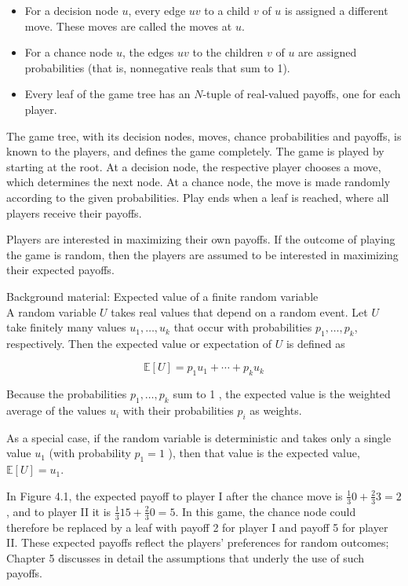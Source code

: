 \documentclass[12pt]{article}
\begin{document}
\begin{itemize}
  \item For a decision node $u$, every edge $u v$ to a child $v$ of $u$ is assigned a different move. These moves are called the moves at $u$.
  \item For a chance node $u$, the edges $u v$ to the children $v$ of $u$ are assigned probabilities (that is, nonnegative reals that sum to 1).
  \item Every leaf of the game tree has an $N$-tuple of real-valued payoffs, one for each player.
\end{itemize}

The game tree, with its decision nodes, moves, chance probabilities and payoffs, is known to the players, and defines the game completely. The game is played by starting at the root. At a decision node, the respective player chooses a move, which determines the next node. At a chance node, the move is made randomly\\
according to the given probabilities. Play ends when a leaf is reached, where all players receive their payoffs.

Players are interested in maximizing their own payoffs. If the outcome of playing the game is random, then the players are assumed to be interested in maximizing their expected payoffs.

Background material: Expected value of a finite random variable\\
A random variable $U$ takes real values that depend on a random event. Let $U$ take finitely many values $u_{1}, \ldots, u_{k}$ that occur with probabilities $p_{1}, \ldots, p_{k}$, respectively. Then the expected value or expectation of $U$ is defined as


\begin{equation*}
\mathbb{E}[U]=p_{1} u_{1}+\cdots+p_{k} u_{k} \tag{4.1}
\end{equation*}


Because the probabilities $p_{1}, \ldots, p_{k}$ sum to 1 , the expected value is the weighted average of the values $u_{i}$ with their probabilities $p_{i}$ as weights.

As a special case, if the random variable is deterministic and takes only a single value $u_{1}$ (with probability $p_{1}=1$ ), then that value is the expected value, $\mathbb{E}[U]=u_{1}$.

In Figure 4.1, the expected payoff to player I after the chance move is $\frac{1}{3} 0+\frac{2}{3} 3=2$, and to player II it is $\frac{1}{3} 15+\frac{2}{3} 0=5$. In this game, the chance node could therefore be replaced by a leaf with payoff 2 for player I and payoff 5 for player II. These expected payoffs reflect the players' preferences for random outcomes; Chapter 5 discusses in detail the assumptions that underly the use of such payoffs.
\end{document}
